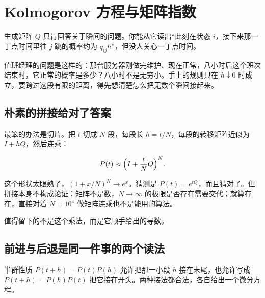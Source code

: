 \section{Kolmogorov 方程与矩阵指数}
\label{sec:06-Random-Processes/05-Continuous-Time-Markov-Chains-and-Queues/02}

生成矩阵 \(Q\) 只肯回答关于瞬间的问题。你能从它读出``此刻在状态 \(i\)，接下来那一丁点时间里往 \(j\) 跳的概率约为 \(q_{ij}h\)''，但没人关心一丁点时间。

值班经理的问题是这样的：那台服务器刚做完维护、现在正常，八小时后这个班次结束时，它正常的概率是多少？八小时不是无穷小。手上的规则只在 \(h\downarrow 0\) 时成立，要跨过这段有限的距离，得先想清楚怎么把无数个瞬间接起来。

\subsection{朴素的拼接给对了答案}

最笨的办法是切片。把 \(t\) 切成 \(N\) 段，每段长 \(h=t/N\)，每段的转移矩阵近似为 \(I+hQ\)，然后连乘：

\[
P(t)\approx\Bigl(I+\frac{t}{N}Q\Bigr)^{N}.
\]

这个形状太眼熟了，\((1+x/N)^N\to e^{x}\)。猜测是 \(P(t)=e^{tQ}\)，而且猜对了。但拼接本身不构成论证：矩阵不是数，\(N\to\infty\) 的极限是否存在需要交代；就算存在，直接对着 \(N=10^4\) 做矩阵连乘也不是能用的算法。

值得留下的不是这个乘法，而是它顺手给出的导数。

\subsection{前进与后退是同一件事的两个读法}

半群性质 \(P(t+h)=P(t)P(h)\) 允许把那一小段 \(h\) 接在末尾，也允许写成 \(P(t+h)=P(h)P(t)\) 把它接在开头。两种接法都合法，各自给出一个微分方程。

